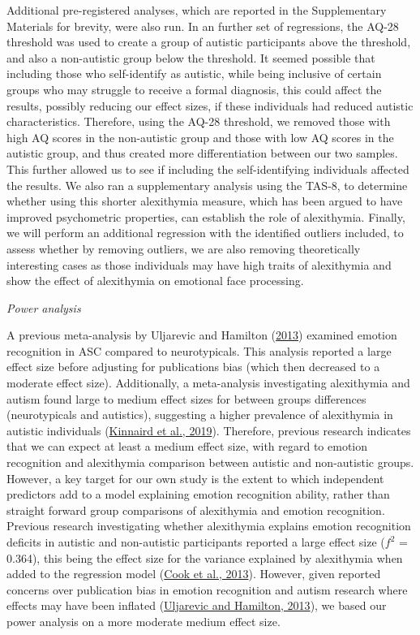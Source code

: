 \documentclass[
]{article}
\begin{document}
Additional pre-registered analyses, which are reported in the Supplementary Materials for brevity, were also run. In an further set of regressions, the AQ-28 threshold was used to create a group of autistic participants above the threshold, and also a non-autistic group below the threshold. It seemed possible that including those who self-identify as autistic, while being inclusive of certain groups who may struggle to receive a formal diagnosis, this could affect the results, possibly reducing our effect sizes, if these individuals had reduced autistic characteristics. Therefore, using the AQ-28 threshold, we removed those with high AQ scores in the non-autistic group and those with low AQ scores in the autistic group, and thus created more differentiation between our two samples. This further allowed us to see if including the self-identifying individuals affected the results. We also ran a supplementary analysis using the TAS-8, to determine whether using this shorter alexithymia measure, which has been argued to have improved psychometric properties, can establish the role of alexithymia. Finally, we will perform an additional regression with the identified outliers included, to assess whether by removing outliers, we are also removing theoretically interesting cases as those individuals may have high traits of alexithymia and show the effect of alexithymia on emotional face processing.

\emph{Power analysis}

A previous meta-analysis by Uljarevic and Hamilton (\protect\hyperlink{ref-uljarevic2013a}{2013}) examined emotion recognition in ASC compared to neurotypicals. This analysis reported a large effect size before adjusting for publications bias (which then decreased to a moderate effect size). Additionally, a meta-analysis investigating alexithymia and autism found large to medium effect sizes for between groups differences (neurotypicals and autistics), suggesting a higher prevalence of alexithymia in autistic individuals (\protect\hyperlink{ref-kinnaird2019a}{Kinnaird et al., 2019}). Therefore, previous research indicates that we can expect at least a medium effect size, with regard to emotion recognition and alexithymia comparison between autistic and non-autistic groups. However, a key target for our own study is the extent to which independent predictors add to a model explaining emotion recognition ability, rather than straight forward group comparisons of alexithymia and emotion recognition. Previous research investigating whether alexithymia explains emotion recognition deficits in autistic and non-autistic participants reported a large effect size (\(f^2\) = 0.364), this being the effect size for the variance explained by alexithymia when added to the regression model (\protect\hyperlink{ref-cook2013a}{Cook et al., 2013}). However, given reported concerns over publication bias in emotion recognition and autism research where effects may have been inflated (\protect\hyperlink{ref-uljarevic2013a}{Uljarevic and Hamilton, 2013}), we based our power analysis on a more moderate medium effect size.
\end{document}
